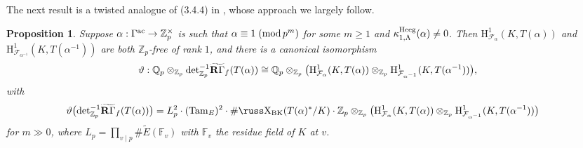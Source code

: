 \documentclass[10pt,reqno]{amsart}
\numberwithin{equation}{section}
\theoremstyle{plain}
\theoremstyle{definition}
\theoremstyle{definition}
\theoremstyle{plain}
\newtheorem{prop}[thm]{Proposition}
\theoremstyle{plain}
\theoremstyle{plain}
\theoremstyle{plain}
\theoremstyle{plain}
\theoremstyle{plain}
\newcommand{\Z}{\mathbb{Z}}
\newcommand{\Q}{\mathbb{Q}}
\def\sha{\hbox{\russ\char88}}
\newcommand{\Fcal}{\mathcal{F}}
\newcommand{\rH}{\mathrm{H}}
\begin{document}
The next result is a twisted analogue of (3.4.4) in \cite{sano-derived}, whose approach we largely follow.


\begin{prop}\label{prop:descent}
Suppose $\alpha:\Gamma^{\rm ac}\rightarrow\Z_p^\times$ is such that $\alpha\equiv 1\;({\rm mod}\,p^m)$ for some $m\geq 1$ and $\kappa_{1,\Lambda}^{\rm Heeg}(\alpha)\neq 0$. Then $\rH^1_{\Fcal_\alpha}(K,T(\alpha))$ and $\rH^1_{\Fcal_{\alpha^{-1}}}(K,T(\alpha^{-1}))$ are both $\Z_p$-free of rank $1$, and there is a canonical isomorphism
\[
\vartheta:\Q_p\otimes_{\Z_p}{\rm det}_{\Z_p}^{-1}\widetilde{\mathbf{R}\Gamma}_f(T(\alpha))\cong\Q_p\otimes_{\Z_p}\bigl(\rH^1_{\Fcal_\alpha}(K,T(\alpha))\otimes_{\Z_p}\rH^1_{\Fcal_{\alpha^{-1}}}(K,T(\alpha^{-1}))\bigr),
\]
with
\begin{align*}
\vartheta\bigl({\rm det}_{\Z_p}^{-1}\widetilde{\mathbf{R}\Gamma}_f(T(\alpha))\bigr)&=L_p^2\cdot({\rm Tam}_E)^2\cdot\#\sha_{\rm BK}(T(\alpha)^*/K)\cdot\Z_p
\otimes_{\Z_p}\bigl(\rH^1_{\Fcal_\alpha}(K,T(\alpha))\otimes_{\Z_p}\rH^1_{\Fcal_{\alpha^{-1}}}(K,T(\alpha^{-1}))\bigr)
\end{align*}
for $m\gg 0$, where $L_p=\prod_{v\mid p}\#\widetilde{E}(\mathbb{F}_v)$ with $\mathbb{F}_v$ the residue field of $K$ at $v$.
\end{prop}
\end{document}
